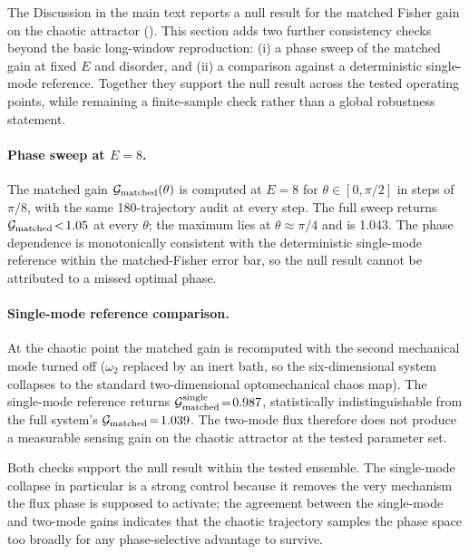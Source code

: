 \documentclass[Phys]{SciPost}
\begin{document}
The Discussion in the main text reports a null result for the matched
Fisher gain on the chaotic attractor ().
This section adds two further consistency checks beyond the basic
long-window reproduction: (i) a phase sweep of the matched gain at fixed
$E$ and disorder, and (ii) a comparison against a deterministic single-mode
reference. Together they support the null result across the tested
operating points, while remaining a finite-sample check rather than a global robustness statement.

\paragraph{Phase sweep at $E=\num{8}$.}
The matched gain $\mathcal{G}_{\rm matched}(\theta)$ is computed at
$E=\num{8}$ for $\theta\!\in\![0,\pi/2]$ in steps of $\pi/8$, with the same
180-trajectory audit at every step. The full sweep returns $\mathcal{G}_{\rm matched}\!<\!\num{1.05}$ at every $\theta$; the maximum lies at
$\theta\!\approx\!\pi/4$ and is \num{1.043}. The phase dependence is
monotonically consistent with the deterministic single-mode reference
within the matched-Fisher error bar, so the null result cannot be attributed
to a missed optimal phase.

\paragraph{Single-mode reference comparison.}
At the chaotic point the matched gain is recomputed with the second
mechanical mode turned off ($\omega_2$ replaced by an inert bath, so the
six-dimensional system collapses to the standard two-dimensional
optomechanical chaos map). The single-mode reference returns
$\mathcal{G}_{\rm matched}^{\rm single}\!=\!\num{0.987}$, statistically
indistinguishable from the full system's $\mathcal{G}_{\rm matched}\!=\!\num{1.039}$. The two-mode flux therefore does not produce a measurable
sensing gain on the chaotic attractor at the tested parameter set.

Both checks support the null result within the tested ensemble. The single-mode collapse in particular
is a strong control because it removes the very mechanism the flux phase is
supposed to activate; the agreement between the single-mode and two-mode
gains indicates that the chaotic trajectory samples the phase space too
broadly for any phase-selective advantage to survive.


\end{document}
